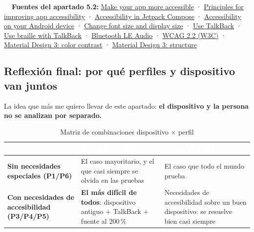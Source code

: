 \documentclass[11pt,a4paper]{article}
\begin{document}
	\begin{fuentesbox}
		\textbf{\color{muted}\faBook\ \ Fuentes del apartado 5.2:}
		\href{https://developer.android.com/guide/topics/ui/accessibility/apps}{Make your app more accessible} ·
		\href{https://developer.android.com/guide/topics/ui/accessibility/principles}{Principles for improving app accessibility} ·
		\href{https://developer.android.com/develop/ui/compose/accessibility}{Accessibility in Jetpack Compose} ·
		\href{https://support.google.com/accessibility/android/answer/6006564}{Accessibility on your Android device} ·
		\href{https://support.google.com/accessibility/android/answer/11183305}{Change font size and display size} ·
		\href{https://support.google.com/accessibility/android/answer/6007100}{Use TalkBack} ·
		\href{https://support.google.com/accessibility/android/answer/16323943}{Use braille with TalkBack} ·
		\href{https://developer.android.com/develop/connectivity/bluetooth/ble-audio/overview}{Bluetooth LE Audio} ·
		\href{https://www.w3.org/TR/WCAG22/}{WCAG 2.2 (W3C)} ·
		\href{https://m3.material.io/foundations/designing/color-contrast}{Material Design 3: color contrast} ·
		\href{https://m3.material.io/foundations/designing/structure}{Material Design 3: structure}
	\end{fuentesbox}
	
	\subsection{Reflexión final: por qué perfiles y dispositivo van juntos}
	
	La idea que más me quiero llevar de este apartado: \textbf{el dispositivo y la persona no se analizan por separado.}
	
	\begin{table}[htbp]
		\centering
		\begin{tabularx}{\textwidth}{@{}>{\RaggedRight\arraybackslash}p{3.3cm} >{\RaggedRight\arraybackslash}X >{\RaggedRight\arraybackslash}X@{}}
			\toprule
			\rowcolor{primary}
			\textcolor{white}{\sffamily\bfseries} & \textcolor{white}{\sffamily\bfseries Gama baja (P2)} & \textcolor{white}{\sffamily\bfseries Gama alta (P1)} \\
			\midrule
			\textbf{Sin necesidades especiales (P1/P6)} & El caso mayoritario, y el que casi siempre se olvida en las pruebas & El caso que todo el mundo prueba \\
			\rowcolor{soft}
			\textbf{Con necesidades de accesibilidad (P3/P4/P5)} & \textbf{El más difícil de todos}: dispositivo antiguo + TalkBack + fuente al 200\,\% & Necesidades de accesibilidad sobre un buen dispositivo: se resuelve bien casi siempre \\
			\bottomrule
		\end{tabularx}
		\caption{Matriz de combinaciones dispositivo $\times$ perfil}
	\end{table}
	
\end{document}
